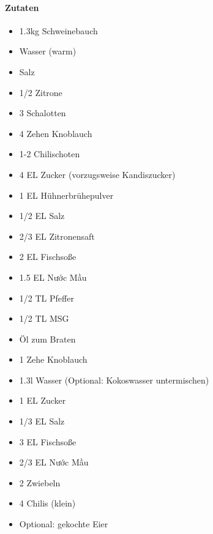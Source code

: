 \newpage
{}

\paragraph{Zutaten}
\begin{itemize}[noitemsep]
	\item 1.3kg Schweinebauch
	\item Wasser (warm)
	\item Salz
	\item 1/2 Zitrone 
	\item 3 Schalotten 
	\item 4 Zehen Knoblauch
	\item 1-2 Chilischoten
	\item 4 EL Zucker (vorzugsweise Kandiszucker)
	\item 1 EL Hühnerbrühepulver
	\item 1/2 EL Salz
	\item 2/3 EL Zitronensaft
	\item 2 EL Fischsoße
	\item 1.5 EL Nước Mầu
	\item 1/2 TL Pfeffer
	\item 1/2 TL MSG
	\item Öl zum Braten
	\item 1 Zehe Knoblauch
	\vspace{0.5cm}
	\item 1.3l Wasser (Optional: Kokoswasser untermischen)
	\item 1 EL Zucker
	\item 1/3 EL Salz
	\item 3 EL Fischsoße
	\item 2/3 EL Nước Mầu 
	\item 2 Zwiebeln
	\item 4 Chilis (klein)
	\item Optional: gekochte Eier
\end{itemize}



